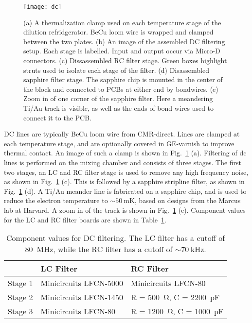 \begin{figure}
    \texttt{[image: dc]}
    \caption[DC thermalization]
    {\label{fig:dc}(a) A thermalization clamp used on each temperature stage of the dilution refridgerator. BeCu loom
    wire is wrapped and clamped between the two plates. (b) An image of the assembled DC filtering setup. Each stage
    is labelled. Input and output occur via Micro-D connectors. (c) Dissassembled RC filter stage. Green boxes
    highlight struts used to isolate each stage of the filter. (d) Disassembled sapphire filter stage. The sapphire
    chip is mounted in the center of the block and connected to PCBs at either end by bondwires. (e) Zoom in of
    one corner of the sapphire filter. Here a meandering Ti/Au track is visible, as well as the ends of bond wires
    used to connect it to the PCB.}
\end{figure}

DC lines are typically BeCu loom wire from CMR-direct. Lines are clamped at each temperature stage, and are optionally
covered in GE-varnish to improve thermal contact. An image of such a clamp is shown in Fig.~\ref{fig:dc} (a). Filtering
of dc lines is performed on the mixing chamber and consists of three stages. The first two stages, an LC and RC filter
stage is used to remove any high frequency noise, as shown in Fig.~\ref{fig:dc} (c). This is followed by a sapphire
stripline filter, as shown in Fig.~\ref{fig:dc} (d). A Ti/Au meander line is fabricated on a sapphire chip, and is used
to reduce the electron temperature to $\sim \SI{50}{\milli\kelvin}$, based on designs from the Marcus lab at Harvard.
A zoom in of the track is shown in Fig.~\ref{fig:dc} (e). Component values for the LC and RC filter boards are shown in
Table~\ref{tab:filt}.

\begin{table}
    \centering
    \begin{tabular}{|l|l|l|}
    \hline
     & LC Filter & RC Filter \\
    \hline
    Stage 1 & Minicircuits LFCN-5000 & Minicircuits LFCN-80\\
    Stage 2 & Minicircuits LFCN-1450 & R = \SI{500}{\ohm}, C = \SI{2200}{\pico\farad} \\
    Stage 3 & Minicircuits LFCN-80 & R = \SI{1200}{\ohm}, C = \SI{1000}{\pico\farad} \\
    \hline
    \end{tabular}
    \caption[Component values for DC filers]{Component values for DC filtering. The LC filter has a cutoff of \SI{80}{\mega\hertz}, while the RC filter
    has a cutoff of $\sim \SI{70}{\kilo\hertz}$.}
    \label{tab:filt}
  \end{table}
